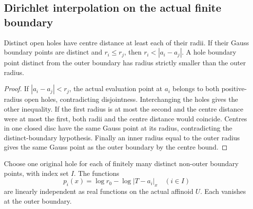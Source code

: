 \subsection{Dirichlet interpolation on the actual finite boundary}\label{subsec:fc-line-dirichlet}

\begin{lemma}\label{lem:fc-hole-boundary-separation}
\leanok
{}
Distinct open holes have centre distance at least each of their radii.
If their Gauss boundary points are distinct and $r_i\le r_j$, then
$r_i<|a_i-a_j|$. A hole boundary point distinct from the outer boundary has
radius strictly smaller than the outer radius.
\end{lemma}

\begin{proof}
If $|a_i-a_j|<r_j$, the actual evaluation point at $a_i$ belongs to both
positive-radius open holes, contradicting disjointness. Interchanging the
holes gives the other inequality. If the first radius is at most the second
and the centre distance were at most the first, both radii and the centre
distance would coincide. Centres in one closed disc have the same Gauss
point at its radius, contradicting the distinct-boundary hypothesis.
Finally an inner radius equal to the outer radius gives the same Gauss point
as the outer boundary by the centre bound.
\end{proof}

\begin{lemma}\label{lem:fc-dirichlet-independent}
\leanok
{}
Choose one original hole for each of finitely many distinct non-outer boundary
points, with index set $I$. The functions
\[
 p_i(x)=\log r_0-\log|T-a_i|_x\quad (i\in I)
\]
are linearly independent as real functions on the actual affinoid $U$.
Each vanishes at the outer boundary.
\end{lemma}


